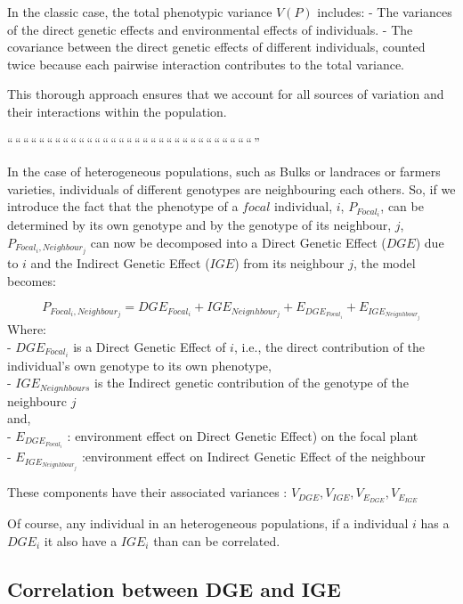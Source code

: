 \documentclass[
]{article}
\begin{document}
In the classic case, the total phenotypic variance \(V(P)\) includes: -
The variances of the direct genetic effects and environmental effects of
individuals. - The covariance between the direct genetic effects of
different individuals, counted twice because each pairwise interaction
contributes to the total variance.

This thorough approach ensures that we account for all sources of
variation and their interactions within the population.

``\,``\,``\,``\,``\,``\,``\,``\,``\,``\,``\,``\,``\,``\,``\,``\,``\,``\,``\,``\,``\,``\,``\,``\,``\,``\,``\,``\,``\,``\,``\,''

In the case of heterogeneous populations, such as Bulks or landraces or
farmers varieties, individuals of different genotypes are neighbouring
each others. So, if we introduce the fact that the phenotype of a
\(focal\) individual, \(i\), \(P_{Focal_i}\), can be determined by its
own genotype and by the genotype of its neighbour, \(j\),
\(P_{Focal_i, Neighbour_j}\) can now be decomposed into a Direct Genetic
Effect (\(DGE\)) due to \(i\) and the Indirect Genetic Effect (\(IGE\))
from its neighbour \(j\), the model becomes:

\[P_{Focal_i, Neighbour_j} = DGE_{Focal_i} + IGE_{Neignhbour_j} + E_{DGE_{Focal_i}} + E_{IGE_{Neignhbour_j}}\]
Where:\\
- \(DGE_{Focal_i}\) is a Direct Genetic Effect of \(i\), i.e., the
direct contribution of the individual's own genotype to its own
phenotype,\\
- \(IGE_{Neignhbours}\) is the Indirect genetic contribution of the
genotype of the neighbourc \(j\)\\
and,\\
- \(E_{DGE_{Focal_i}}\) : environment effect on Direct Genetic Effect)
on the focal plant\\
- \(E_{IGE_{Neignhbour_j}}\) :environment effect on Indirect Genetic
Effect of the neighbour

These components have their associated variances :
\(V_{DGE},V_{IGE}, V_{E_{DGE}}, V_{E_{IGE}}\)

Of course, any individual in an heterogeneous populations, if a
individual \(i\) has a \(DGE_i\) it also have a \(IGE_i\) than can be
correlated.

\subsection{Correlation between DGE and
IGE}\label{correlation-between-dge-and-ige}
\end{document}
